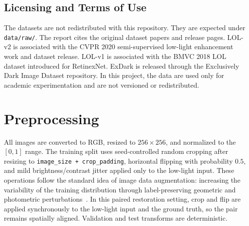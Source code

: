 \documentclass[10pt,twocolumn]{article}
\begin{document}
\begin{table}[!htbp]
\centering
\caption{Dataset protocol used in the experiments.}
\label{tab:datasets}
\small
{}
\end{table}

\subsection{Licensing and Terms of Use}
The datasets are not redistributed with this repository. They are expected under \texttt{data/raw/}. The report cites the original dataset papers and release pages. LOL-v2 is associated with the CVPR 2020 semi-supervised low-light enhancement work and dataset release. LOL-v1 is associated with the BMVC 2018 LOL dataset introduced for RetinexNet. ExDark is released through the Exclusively Dark Image Dataset repository. In this project, the data are used only for academic experimentation and are not versioned or redistributed.

\section{Preprocessing}
All images are converted to RGB, resized to $256 \times 256$, and normalized to the $[0,1]$ range. The training split uses seed-controlled random cropping after resizing to \texttt{image\_size + crop\_padding}, horizontal flipping with probability $0.5$, and mild brightness/contrast jitter applied only to the low-light input. These operations follow the standard idea of image data augmentation: increasing the variability of the training distribution through label-preserving geometric and photometric perturbations~\cite{krizhevsky2012imagenet,shorten2019augmentation}. In this paired restoration setting, crop and flip are applied synchronously to the low-light input and the ground truth, so the pair remains spatially aligned. Validation and test transforms are deterministic.
\end{document}
